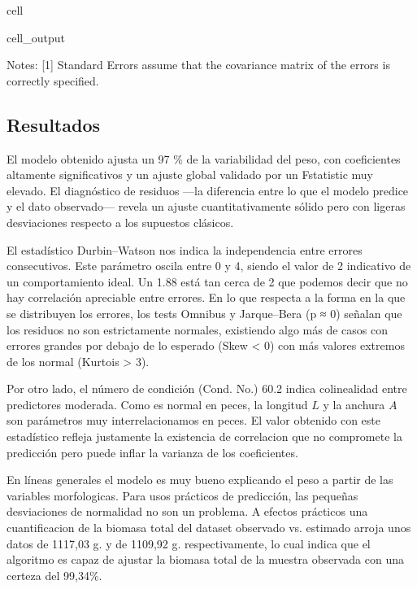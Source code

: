 \documentclass[a4paper,10pt,spanish]{jupyterBook}
\begin{document}
\begin{sphinxuseclass}{cell}
\begin{sphinxVerbatimOutput}
\begin{sphinxuseclass}{cell_output}
\begin{sphinxVerbatim}[commandchars=\\\{\}]
Notes:
[1] Standard Errors assume that the covariance matrix of the errors is correctly specified.
\end{sphinxVerbatim}

\noindent{}

\end{sphinxuseclass}\end{sphinxVerbatimOutput}

\end{sphinxuseclass}

\subsection{Resultados}
\label{\detokenize{content/03/Modelo:resultados}}
\sphinxAtStartPar
El modelo obtenido ajusta un 97 \% de la variabilidad del peso, con coeficientes altamente significativos y un ajuste global validado por un F\sphinxhyphen{}statistic muy elevado. El diagnóstico de residuos —la diferencia entre lo que el modelo predice y el dato observado— revela un ajuste cuantitativamente sólido pero con ligeras desviaciones respecto a los supuestos clásicos.

\sphinxAtStartPar
El estadístico Durbin–Watson nos indica la independencia entre errores consecutivos. Este parámetro oscila entre 0 y 4, siendo el valor de 2 indicativo de un comportamiento ideal. Un 1.88 está tan cerca de 2 que podemos decir que no hay correlación apreciable entre errores. En lo que respecta a la forma en la que se distribuyen los errores, los tests Omnibus y Jarque–Bera (p ≈ 0) señalan que los residuos no son estrictamente normales, existiendo algo más de casos con errores grandes por debajo de lo esperado (Skew < 0) con más valores extremos de los normal (Kurtois > 3).

\sphinxAtStartPar
Por otro lado,  el número de condición (Cond. No.) 60.2 indica colinealidad entre predictores moderada. Como es normal en peces, la longitud \(L\) y la anchura \(A\) son parámetros muy interrelacionamos en peces. El valor obtenido con este estadístico refleja justamente la existencia de correlacion que no compromete la predicción pero puede inflar la varianza de los coeficientes.

\sphinxAtStartPar
En líneas generales el modelo es muy bueno explicando el peso a partir de las variables morfologicas. Para usos prácticos de predicción, las pequeñas desviaciones de normalidad no son un problema. A efectos prácticos una cuantificacion de la biomasa total del dataset observado vs. estimado arroja unos datos de 1117,03 g. y de 1109,92 g. respectivamente, lo cual indica que el algoritmo es capaz de ajustar la biomasa total de la muestra observada con una certeza del 99,34\%.







\renewcommand{\indexname}{Index}
\printindex
\end{document}
